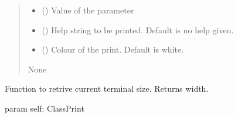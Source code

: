 \documentclass[letterpaper,10pt,english]{sphinxmanual}
\begin{document}
\begin{fulllineitems}
\begin{fulllineitems}
\begin{quote}
\begin{description}
\begin{itemize}
\item {} 
\sphinxAtStartPar
{} () \textendash{} Value of the parameter

\item {} 
\sphinxAtStartPar
{} () \textendash{} Help string to be printed. Default is no help given.

\item {} 
\sphinxAtStartPar
{} () \textendash{} Colour of the print. Default is white.

\end{itemize}

\sphinxAtStartPar
None

\end{description}\end{quote}

\end{fulllineitems}


\begin{fulllineitems}
\label{\detokenize{api/killMS.Other:killMS.Other.ClassPrint.ClassPrint.getWidth}}
\pysigstartsignatures
{}
\pysigstopsignatures
\sphinxAtStartPar
Function to retrive current terminal size. Returns width.

\sphinxAtStartPar
param self: ClassPrint
\begin{quote}\begin{description}
\sphinxAtStartPar
{}

\end{description}\end{quote}

\end{fulllineitems}


\end{fulllineitems}
\end{document}
